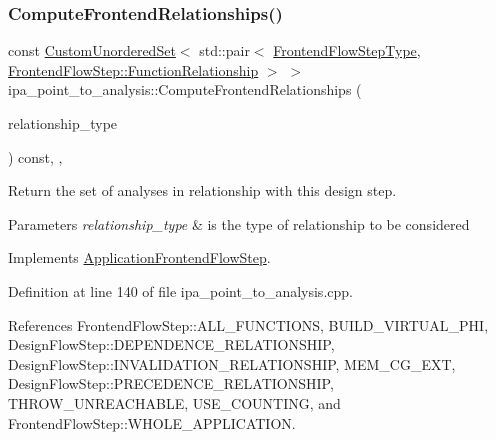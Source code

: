\subsubsection{\texorpdfstring{Compute\+Frontend\+Relationships()}{ComputeFrontendRelationships()}}
{\footnotesize\ttfamily const \hyperlink{classCustomUnorderedSet}{Custom\+Unordered\+Set}$<$ std\+::pair$<$ \hyperlink{frontend__flow__step_8hpp_afeb3716c693d2b2e4ed3e6d04c3b63bb}{Frontend\+Flow\+Step\+Type}, \hyperlink{classFrontendFlowStep_af7cf30f2023e5b99e637dc2058289ab0}{Frontend\+Flow\+Step\+::\+Function\+Relationship} $>$ $>$ ipa\+\_\+point\+\_\+to\+\_\+analysis\+::\+Compute\+Frontend\+Relationships (\begin{DoxyParamCaption}\item[{const \hyperlink{classDesignFlowStep_a723a3baf19ff2ceb77bc13e099d0b1b7}{Design\+Flow\+Step\+::\+Relationship\+Type}}]{relationship\+\_\+type }\end{DoxyParamCaption}) const\hspace{0.3cm}{\ttfamily [override]}, {\ttfamily [private]}, {\ttfamily [virtual]}}



Return the set of analyses in relationship with this design step. 


\begin{DoxyParams}{Parameters}
{\em relationship\+\_\+type} & is the type of relationship to be considered \\
\hline
\end{DoxyParams}


Implements \hyperlink{classApplicationFrontendFlowStep_ab308200c0096ccff3a1ff50e864ed61f}{Application\+Frontend\+Flow\+Step}.



Definition at line 140 of file ipa\+\_\+point\+\_\+to\+\_\+analysis.\+cpp.



References Frontend\+Flow\+Step\+::\+A\+L\+L\+\_\+\+F\+U\+N\+C\+T\+I\+O\+NS, B\+U\+I\+L\+D\+\_\+\+V\+I\+R\+T\+U\+A\+L\+\_\+\+P\+HI, Design\+Flow\+Step\+::\+D\+E\+P\+E\+N\+D\+E\+N\+C\+E\+\_\+\+R\+E\+L\+A\+T\+I\+O\+N\+S\+H\+IP, Design\+Flow\+Step\+::\+I\+N\+V\+A\+L\+I\+D\+A\+T\+I\+O\+N\+\_\+\+R\+E\+L\+A\+T\+I\+O\+N\+S\+H\+IP, M\+E\+M\+\_\+\+C\+G\+\_\+\+E\+XT, Design\+Flow\+Step\+::\+P\+R\+E\+C\+E\+D\+E\+N\+C\+E\+\_\+\+R\+E\+L\+A\+T\+I\+O\+N\+S\+H\+IP, T\+H\+R\+O\+W\+\_\+\+U\+N\+R\+E\+A\+C\+H\+A\+B\+LE, U\+S\+E\+\_\+\+C\+O\+U\+N\+T\+I\+NG, and Frontend\+Flow\+Step\+::\+W\+H\+O\+L\+E\+\_\+\+A\+P\+P\+L\+I\+C\+A\+T\+I\+ON.

